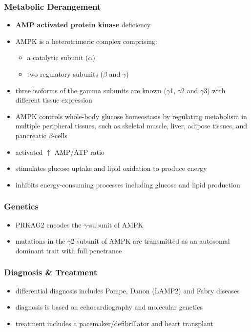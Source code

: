 \documentclass[12pt]{scrartcl}
\begin{document}
\subsubsection{Metabolic Derangement}
\label{sec:org1d6ceb2}
\begin{itemize}
\item \textbf{AMP activated protein kinase} deficiency
\item AMPK is a heterotrimeric complex comprising:
\begin{itemize}
\item a catalytic subunit (\(\alpha\))
\item two regulatory subunits (\(\beta\) and \(\gamma\))
\end{itemize}
\item three isoforms of the gamma subunits are known (\(\gamma\)1, \(\gamma\)2 and \(\gamma\)3) with different tissue
expression
\item AMPK controls whole-body glucose homeostasis by regulating metabolism in multiple peripheral tissues, such as
skeletal muscle, liver, adipose tissues, and pancreatic \(\beta\)-cells
\item activated \(\uparrow\) AMP/ATP ratio
\item stimulates glucose uptake and lipid oxidation to produce energy
\item inhibits energy-consuming processes including glucose and lipid production
\end{itemize}
\subsubsection{Genetics}
\label{sec:org033c30a}
\begin{itemize}
\item PRKAG2 encodes the \(\gamma\)-subunit of AMPK
\item mutations in the \(\gamma\)2-subunit of AMPK are transmitted as an
autosomal dominant trait with full penetrance
\end{itemize}

\subsubsection{Diagnosis \& Treatment}
\label{sec:org86a42de}
\begin{itemize}
\item differential diagnosis includes Pompe, Danon (LAMP2) and Fabry diseases
\item diagnosis is based on echocardiography and molecular genetics
\item treatment includes a pacemaker/defibrillator and heart transplant
\end{itemize}
\end{document}
